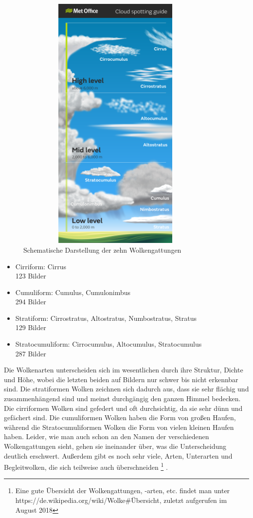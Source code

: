 \documentclass[a4,german]{article}
\begin{document}
\begin{figure}[h!]
\centering
\includegraphics[width=10cm,height=13cm,keepaspectratio]{Cloud_infographic-01.png}
\caption{Schematische Darstellung der zehn Wolkengattungen}
    \label{fig:cloudtypes}
\end{figure}

\begin{itemize}
\item Cirriform: Cirrus\\123 Bilder
\item Cumuliform: Cumulus, Cumulonimbus\\294 Bilder
\item Stratiform: Cirrostratus, Altostratus, Numbostratus, Stratus\\129 Bilder
\item Stratocumuliform: Cirrocumulus, Altocumulus, Stratocumulus\\287 Bilder
\end{itemize}

Die Wolkenarten unterscheiden sich im wesentlichen durch ihre Struktur, Dichte und Höhe, wobei die letzten beiden auf Bildern nur schwer bis nicht erkennbar sind. Die stratiformen Wolken zeichnen sich dadurch aus, dass sie sehr flächig und zusammenhängend sind und meinst durchgängig den ganzen Himmel bedecken. Die cirriformen Wolken sind gefedert und oft durchsichtig, da sie sehr dünn und gefächert sind. Die cumuliformen Wolken haben die Form von großen Haufen, während die Stratocumuliformen Wolken die Form von vielen kleinen Haufen haben. Leider, wie man auch schon an den Namen der verschiedenen Wolkengattungen sieht, gehen sie ineinander über, was die Unterscheidung deutlich erschwert. Außerdem gibt es noch sehr viele, Arten, Unterarten und Begleitwolken, die sich teilweise auch überschneiden \footnote{Eine gute Übersicht der Wolkengattungen, -arten, etc. findet man unter\\ https://de.wikipedia.org/wiki/Wolke\#Übersicht, zuletzt aufgerufen im August 2018} . 
\end{document}
